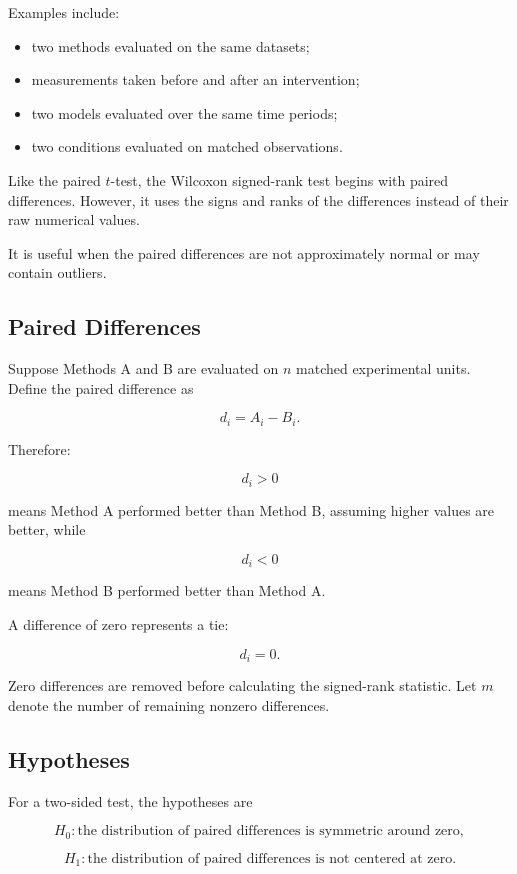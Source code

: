 \documentclass[11pt]{article}
\begin{document}
Examples include:

\begin{itemize}[noitemsep]
    \item two methods evaluated on the same datasets;
    \item measurements taken before and after an intervention;
    \item two models evaluated over the same time periods;
    \item two conditions evaluated on matched observations.
\end{itemize}

Like the paired \(t\)-test, the Wilcoxon signed-rank test begins with
paired differences. However, it uses the signs and ranks of the
differences instead of their raw numerical values.

It is useful when the paired differences are not approximately normal or
may contain outliers.

\subsection{Paired Differences}

Suppose Methods A and B are evaluated on \(n\) matched experimental
units. Define the paired difference as

\[
d_i=A_i-B_i.
\]

Therefore:

\[
d_i>0
\]

means Method A performed better than Method B, assuming higher values are
better, while

\[
d_i<0
\]

means Method B performed better than Method A.

A difference of zero represents a tie:

\[
d_i=0.
\]

Zero differences are removed before calculating the signed-rank
statistic. Let \(m\) denote the number of remaining nonzero differences.

\subsection{Hypotheses}

For a two-sided test, the hypotheses are

\[
H_0:
\text{the distribution of paired differences is symmetric around zero},
\]

\[
H_1:
\text{the distribution of paired differences is not centered at zero}.
\]
\end{document}
